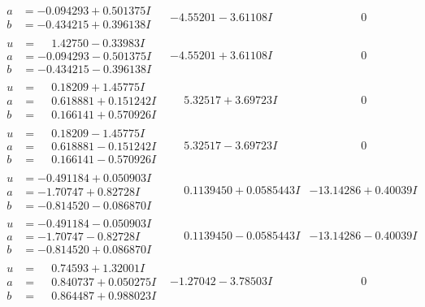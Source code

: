 \documentclass[1p]{elsarticle_modified}
\theoremstyle{definition}
\begin{document}
$$\begin{array}{c|c|c}
\begin{aligned}
a &= -0.094293 + 0.501375 I \\
b &= -0.434215 + 0.396138 I\end{aligned}
 & -4.55201 - 3.61108 I & \phantom{-0.000000 } 0 \\ \hline\begin{aligned}
u &= \phantom{-}1.42750 - 0.33983 I \\
a &= -0.094293 - 0.501375 I \\
b &= -0.434215 - 0.396138 I\end{aligned}
 & -4.55201 + 3.61108 I & \phantom{-0.000000 } 0 \\ \hline\begin{aligned}
u &= \phantom{-}0.18209 + 1.45775 I \\
a &= \phantom{-}0.618881 + 0.151242 I \\
b &= \phantom{-}0.166141 + 0.570926 I\end{aligned}
 & \phantom{-}5.32517 + 3.69723 I & \phantom{-0.000000 } 0 \\ \hline\begin{aligned}
u &= \phantom{-}0.18209 - 1.45775 I \\
a &= \phantom{-}0.618881 - 0.151242 I \\
b &= \phantom{-}0.166141 - 0.570926 I\end{aligned}
 & \phantom{-}5.32517 - 3.69723 I & \phantom{-0.000000 } 0 \\ \hline\begin{aligned}
u &= -0.491184 + 0.050903 I \\
a &= -1.70747 + 0.82728 I \\
b &= -0.814520 - 0.086870 I\end{aligned}
 & \phantom{-}0.1139450 + 0.0585443 I & -13.14286 + 0.40039 I \\ \hline\begin{aligned}
u &= -0.491184 - 0.050903 I \\
a &= -1.70747 - 0.82728 I \\
b &= -0.814520 + 0.086870 I\end{aligned}
 & \phantom{-}0.1139450 - 0.0585443 I & -13.14286 - 0.40039 I \\ \hline\begin{aligned}
u &= \phantom{-}0.74593 + 1.32001 I \\
a &= \phantom{-}0.840737 + 0.050275 I \\
b &= \phantom{-}0.864487 + 0.988023 I\end{aligned}
 & -1.27042 - 3.78503 I & \phantom{-0.000000 } 0 \\ \hline\begin{aligned}

\end{aligned}
\end{array}$$
\end{document}
